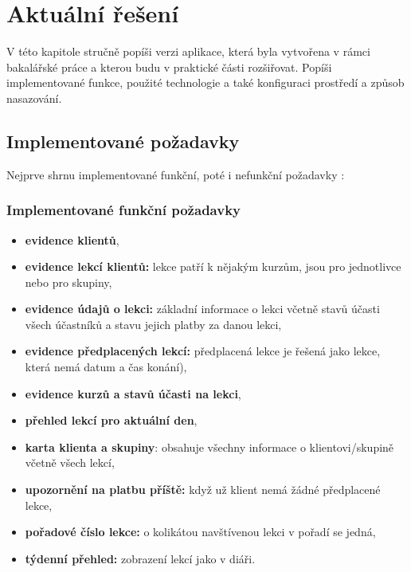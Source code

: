 \chapter{Aktuální řešení}
V této kapitole stručně popíši verzi aplikace, která byla vytvořena v rámci bakalářské práce \cite{bp} a kterou budu v praktické části rozšiřovat. Popíši implementované funkce, použité technologie a také konfiguraci prostředí a způsob nasazování.

\section{Implementované požadavky}
Nejprve shrnu implementované funkční, poté i nefunkční požadavky \cite{bp}:
\subsection{Implementované funkční požadavky}
\begin{itemize}
    \item \textbf{evidence klientů},
    \item \textbf{evidence lekcí klientů:} lekce patří k nějakým kurzům, jsou pro jednotlivce nebo pro skupiny,
    \item \textbf{evidence údajů o lekci:} základní informace o lekci včetně stavů účasti všech účastníků a stavu jejich platby za danou lekci,
    \item \textbf{evidence předplacených lekcí:} předplacená lekce je řešená jako lekce, která nemá datum a čas konání),
    \item \textbf{evidence kurzů a stavů účasti na lekci},
    \item \textbf{přehled lekcí pro aktuální den},
    \item \textbf{karta klienta a skupiny}: obsahuje všechny informace o klientovi/skupině včetně všech lekcí,
    \item \textbf{upozornění na platbu příště:} když už klient nemá žádné předplacené lekce,
    \item \textbf{pořadové číslo lekce:} o kolikátou navštívenou lekci v pořadí se jedná,
    \item \textbf{týdenní přehled:} zobrazení lekcí jako v diáři.
\end{itemize}

